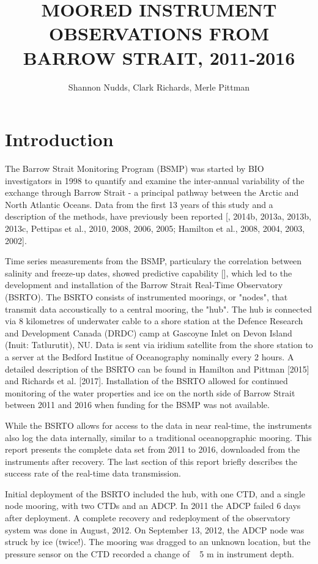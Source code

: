 \documentclass[12pt]{dforeport}
\title{MOORED INSTRUMENT OBSERVATIONS FROM BARROW STRAIT, 2011-2016}
\author{Shannon Nudds, Clark Richards, Merle Pittman} %
\begin{document}

\frontmatter
\mainmatter
{} %
\fontsize{10}{12}\selectfont

\section{Introduction}

The Barrow Strait Monitoring Program (BSMP) was started by BIO investigators in 1998 to quantify and examine the inter-annual variability of the exchange through Barrow Strait - a principal pathway between the Arctic and North Atlantic Oceans. Data from the first 13 years of this study and a description of the methods, have previously been reported [\cite{ph2015}, 2014b, 2013a, 2013b, 2013c, Pettipas et al., 2010, 2008, 2006, 2005; Hamilton et al., 2008, 2004, 2003, 2002]. 

Time series measurements from the BSMP, particulary the correlation between salinity and freeze-up dates, showed predictive capability [\cite{jhmp2015}], which led to the development and installation of the Barrow Strait Real-Time Observatory (BSRTO). The BSRTO consists of instrumented moorings, or "nodes", that transmit data accoustically to a central mooring, the "hub". The hub is connected via 8 kilometres of underwater cable to a shore station at the Defence Research and Development Canada (DRDC) camp at Gascoyne Inlet on Devon Island (Inuit: Tatlurutit), NU.  Data is sent via iridium satellite from the shore station to a server at the Bedford Institue of Oceanography nominally every 2 hours. A detailed description of the BSRTO can be found in Hamilton and Pittman [2015] and Richards et al. [2017]. Installation of the BSRTO allowed for continued monitoring of the water properties and ice on the north side of Barrow Strait between 2011 and 2016 when funding for the BSMP was not available. 

While the BSRTO allows for access to the data in near real-time, the instruments also log the data internally, similar to a traditional oceanopgraphic mooring. This report presents the complete data set from 2011 to 2016, downloaded from the instruments after recovery. The last section of this report briefly describes the success rate of the real-time data transmission.

Initial deployment of the BSRTO included the hub, with one CTD, and a single node mooring, with two CTDs and an ADCP.  In 2011 the ADCP failed 6 days after deployment. A complete recovery and redeployment of the observatory system was done in August, 2012. On September 13, 2012, the ADCP node was struck by ice (twice!). The mooring was dragged to an unknown location, but the pressure sensor on the CTD recorded a change of ~ 5 m in instrument depth. 
\end{document}
